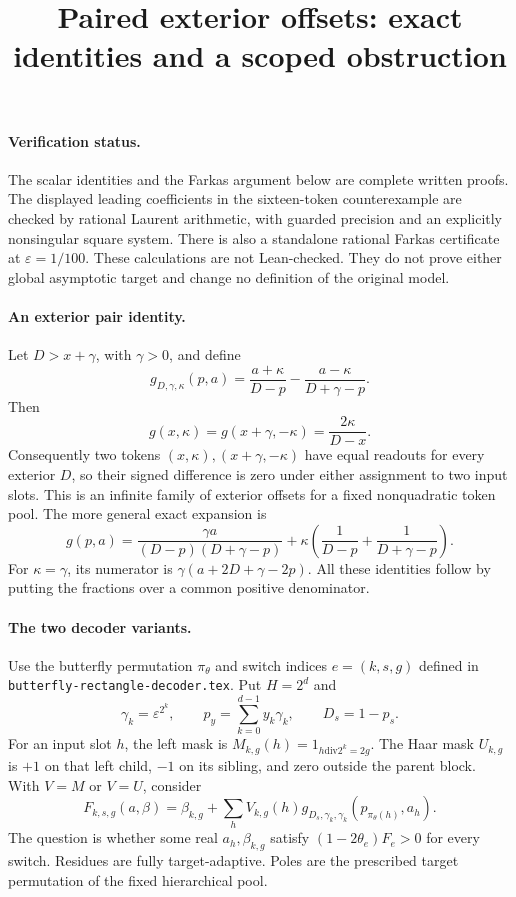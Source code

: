 \documentclass{article}
\begin{document}
\title{Paired exterior offsets: exact identities and a scoped obstruction}
\maketitle

\paragraph{Verification status.}
The scalar identities and the Farkas argument below are complete written
proofs.  The displayed leading coefficients in the sixteen-token
counterexample are checked by rational Laurent arithmetic, with guarded
precision and an explicitly nonsingular square system.  There is also a
standalone rational Farkas certificate at $\varepsilon=1/100$.
These calculations are not Lean-checked.  They do not prove either global
asymptotic target and change no definition of the original model.

\paragraph{An exterior pair identity.}
Let $D>x+\gamma$, with $\gamma>0$, and define
\[
 g_{D,\gamma,\kappa}(p,a)
 =\frac{a+\kappa}{D-p}-\frac{a-\kappa}{D+\gamma-p}.
\]
Then
\[
 g(x,\kappa)=g(x+\gamma,-\kappa)=\frac{2\kappa}{D-x}.
 \tag{1}
\]
Consequently two tokens $(x,\kappa),(x+\gamma,-\kappa)$ have equal
readouts for every exterior $D$, so their signed difference is zero under
either assignment to two input slots.  This is an infinite family of
exterior offsets for a fixed nonquadratic token pool.
The more general exact expansion is
\[
 g(p,a)=\frac{\gamma a}{(D-p)(D+\gamma-p)}
       +\kappa\left(\frac1{D-p}+\frac1{D+\gamma-p}\right).
 \tag{2}
\]
For $\kappa=\gamma$, its numerator is
$\gamma(a+2D+\gamma-2p)$.
All these identities follow by putting the fractions over a common
positive denominator.

\paragraph{The two decoder variants.}
Use the butterfly permutation $\pi_\theta$ and switch indices
$e=(k,s,g)$ defined in \texttt{butterfly-rectangle-decoder.tex}.
Put $H=2^d$ and
\[
 \gamma_k=\varepsilon^{2^k},\qquad
 p_y=\sum_{k=0}^{d-1}y_k\gamma_k,\qquad D_s=1-p_s.
\]
For an input slot $h$, the left mask is
$M_{k,g}(h)=1_{h\mathbin{\mathrm{div}}2^k=2g}$.
The Haar mask $U_{k,g}$ is $+1$ on that left child, $-1$ on its sibling,
and zero outside the parent block.  With $V=M$ or $V=U$, consider
\[
 F_{k,s,g}(a,\beta)=\beta_{k,g}
 +\sum_h V_{k,g}(h)
       g_{D_s,\gamma_k,\gamma_k}(p_{\pi_\theta(h)},a_h).
 \tag{3}
\]
The question is whether some real $a_h,\beta_{k,g}$ satisfy
$(1-2\theta_e)F_e>0$ for every switch.  Residues are fully target-adaptive.
Poles are the prescribed target permutation of the fixed hierarchical pool.
\end{document}
